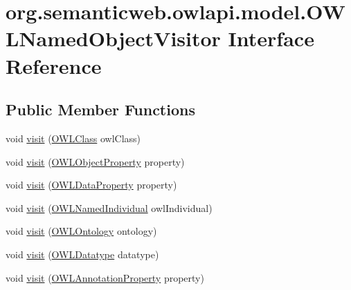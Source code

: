 \hypertarget{interfaceorg_1_1semanticweb_1_1owlapi_1_1model_1_1_o_w_l_named_object_visitor}{\section{org.\-semanticweb.\-owlapi.\-model.\-O\-W\-L\-Named\-Object\-Visitor Interface Reference}
\label{interfaceorg_1_1semanticweb_1_1owlapi_1_1model_1_1_o_w_l_named_object_visitor}
}
\subsection*{Public Member Functions}
\begin{DoxyCompactItemize}
\item 
void \hyperlink{interfaceorg_1_1semanticweb_1_1owlapi_1_1model_1_1_o_w_l_named_object_visitor_a19a22a9dc64efd84b62c736c02439ef3}{visit} (\hyperlink{interfaceorg_1_1semanticweb_1_1owlapi_1_1model_1_1_o_w_l_class}{O\-W\-L\-Class} owl\-Class)
\item 
void \hyperlink{interfaceorg_1_1semanticweb_1_1owlapi_1_1model_1_1_o_w_l_named_object_visitor_a7a9452d9bea653fd0e66d94fe5100c7b}{visit} (\hyperlink{interfaceorg_1_1semanticweb_1_1owlapi_1_1model_1_1_o_w_l_object_property}{O\-W\-L\-Object\-Property} property)
\item 
void \hyperlink{interfaceorg_1_1semanticweb_1_1owlapi_1_1model_1_1_o_w_l_named_object_visitor_af39f18a63a199d4972384ef768289a70}{visit} (\hyperlink{interfaceorg_1_1semanticweb_1_1owlapi_1_1model_1_1_o_w_l_data_property}{O\-W\-L\-Data\-Property} property)
\item 
void \hyperlink{interfaceorg_1_1semanticweb_1_1owlapi_1_1model_1_1_o_w_l_named_object_visitor_aa6a6c643865bc981b5d5bf6bd0dbebbb}{visit} (\hyperlink{interfaceorg_1_1semanticweb_1_1owlapi_1_1model_1_1_o_w_l_named_individual}{O\-W\-L\-Named\-Individual} owl\-Individual)
\item 
void \hyperlink{interfaceorg_1_1semanticweb_1_1owlapi_1_1model_1_1_o_w_l_named_object_visitor_afbc96e6746ab2878ebb7a9bfbd75979d}{visit} (\hyperlink{interfaceorg_1_1semanticweb_1_1owlapi_1_1model_1_1_o_w_l_ontology}{O\-W\-L\-Ontology} ontology)
\item 
void \hyperlink{interfaceorg_1_1semanticweb_1_1owlapi_1_1model_1_1_o_w_l_named_object_visitor_af92ede15c76ea07dffe264adf237ce4d}{visit} (\hyperlink{interfaceorg_1_1semanticweb_1_1owlapi_1_1model_1_1_o_w_l_datatype}{O\-W\-L\-Datatype} datatype)
\item 
void \hyperlink{interfaceorg_1_1semanticweb_1_1owlapi_1_1model_1_1_o_w_l_named_object_visitor_aa9337aeb03206756f10594ca3d2858c6}{visit} (\hyperlink{interfaceorg_1_1semanticweb_1_1owlapi_1_1model_1_1_o_w_l_annotation_property}{O\-W\-L\-Annotation\-Property} property)
\end{DoxyCompactItemize}


